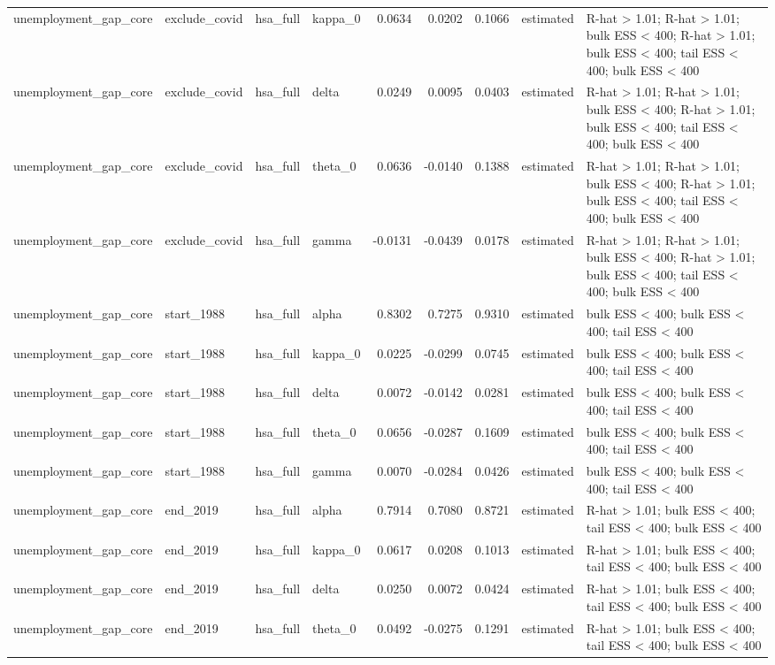 \begin{tabular}{llllrrrll}
unemployment\_gap\_core & exclude\_covid & hsa\_full & kappa\_0 & 0.0634 & 0.0202 & 0.1066 & estimated & R-hat > 1.01; R-hat > 1.01; bulk ESS < 400; R-hat > 1.01; bulk ESS < 400; tail ESS < 400; bulk ESS < 400 \\
unemployment\_gap\_core & exclude\_covid & hsa\_full & delta & 0.0249 & 0.0095 & 0.0403 & estimated & R-hat > 1.01; R-hat > 1.01; bulk ESS < 400; R-hat > 1.01; bulk ESS < 400; tail ESS < 400; bulk ESS < 400 \\
unemployment\_gap\_core & exclude\_covid & hsa\_full & theta\_0 & 0.0636 & -0.0140 & 0.1388 & estimated & R-hat > 1.01; R-hat > 1.01; bulk ESS < 400; R-hat > 1.01; bulk ESS < 400; tail ESS < 400; bulk ESS < 400 \\
unemployment\_gap\_core & exclude\_covid & hsa\_full & gamma & -0.0131 & -0.0439 & 0.0178 & estimated & R-hat > 1.01; R-hat > 1.01; bulk ESS < 400; R-hat > 1.01; bulk ESS < 400; tail ESS < 400; bulk ESS < 400 \\
unemployment\_gap\_core & start\_1988 & hsa\_full & alpha & 0.8302 & 0.7275 & 0.9310 & estimated & bulk ESS < 400; bulk ESS < 400; tail ESS < 400 \\
unemployment\_gap\_core & start\_1988 & hsa\_full & kappa\_0 & 0.0225 & -0.0299 & 0.0745 & estimated & bulk ESS < 400; bulk ESS < 400; tail ESS < 400 \\
unemployment\_gap\_core & start\_1988 & hsa\_full & delta & 0.0072 & -0.0142 & 0.0281 & estimated & bulk ESS < 400; bulk ESS < 400; tail ESS < 400 \\
unemployment\_gap\_core & start\_1988 & hsa\_full & theta\_0 & 0.0656 & -0.0287 & 0.1609 & estimated & bulk ESS < 400; bulk ESS < 400; tail ESS < 400 \\
unemployment\_gap\_core & start\_1988 & hsa\_full & gamma & 0.0070 & -0.0284 & 0.0426 & estimated & bulk ESS < 400; bulk ESS < 400; tail ESS < 400 \\
unemployment\_gap\_core & end\_2019 & hsa\_full & alpha & 0.7914 & 0.7080 & 0.8721 & estimated & R-hat > 1.01; bulk ESS < 400; tail ESS < 400; bulk ESS < 400 \\
unemployment\_gap\_core & end\_2019 & hsa\_full & kappa\_0 & 0.0617 & 0.0208 & 0.1013 & estimated & R-hat > 1.01; bulk ESS < 400; tail ESS < 400; bulk ESS < 400 \\
unemployment\_gap\_core & end\_2019 & hsa\_full & delta & 0.0250 & 0.0072 & 0.0424 & estimated & R-hat > 1.01; bulk ESS < 400; tail ESS < 400; bulk ESS < 400 \\
unemployment\_gap\_core & end\_2019 & hsa\_full & theta\_0 & 0.0492 & -0.0275 & 0.1291 & estimated & R-hat > 1.01; bulk ESS < 400; tail ESS < 400; bulk ESS < 400 \\

\end{tabular}
